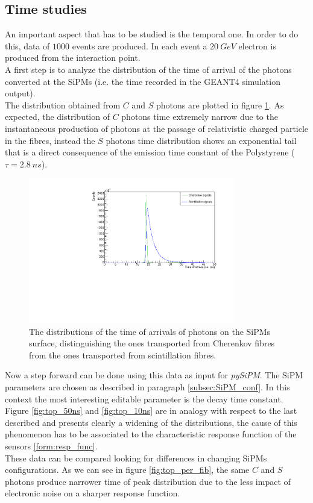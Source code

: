 \subsection{Time studies} \label{subsec:Time}
An important aspect that has to be studied is the temporal one.
In order to do this, data of $1000$ events are produced. In each event a $20\ GeV$ electron is produced from the interaction point.\\
A first step is to analyze the distribution of the time of arrival of the photons converted at the SiPMs (i.e. the time recorded in the GEANT4 simulation output).\\
The distribution obtained from $C$ and $S$ photons are plotted in figure \ref{fig:true_toa_dist}.
As expected, the distribution of $C$ photons time extremely narrow due to the instantaneous production of photons at the passage of relativistic charged particle in the fibres, instead the $S$ photons time distribution shows an exponential tail that is a direct consequence of the emission time constant of the Polystyrene ($\tau = 2.8\ ns$).\\

\begin{figure}
	\centering
	\includegraphics[width=0.8\textwidth]{IMG/Cap5/TrueTimeDist20GeV}
	\caption{The distributions of the time of arrivals of photons on the SiPMs surface, distinguishing the ones transported from Cherenkov fibres from the ones transported from scintillation fibres.}
	\label{fig:true_toa_dist}
\end{figure}

Now a step forward can be done using this data as input for \textit{pySiPM}. The SiPM parameters are chosen as described in paragraph \ref{subsec:SiPM_conf}. In this context the most interesting editable parameter is the decay time constant.\\ 
Figure \ref{fig:top_50ns} and \ref{fig:top_10ns} are in analogy with respect to the last described and presents clearly a widening of the distributions, the cause of this phenomenon has to be associated to the characteristic response function of the sensors \ref{form:resp_func}.\\
These data can be compared looking for differences in changing SiPMs configurations. As we can see in figure \ref{fig:top_per_fib}, the same $C$ and $S$ photons produce narrower time of peak distribution due to the less impact of electronic noise on a sharper response function.\\

